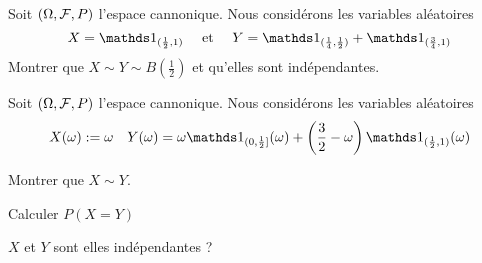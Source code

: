 \documentclass{report}
\begin{document}
\begin{exo}
    Soit \(\left(\Omega,\mathcal{F}, P\right)\) l'espace cannonique. Nous considérons
    les variables aléatoires \[X=\ind_{(\frac12, 1)}\quad\text{ et }\quad
    Y=\ind_{(\frac14,\frac12)} + \ind_{(\frac34, 1)}\] Montrer que \(X\sim Y
    \sim B(\frac12)\) et qu'elles sont indépendantes.
\end{exo}

\begin{exo}
    Soit \(\left(\Omega,\mathcal{F}, P\right)\) l'espace cannonique. Nous considérons
    les variables aléatoires \[X(\omega):=\omega\quad Y(\omega)=
    \omega\ind_{(0,\frac12]}(\omega)+\left(\frac32-\omega\right)
    \ind_{(\frac12, 1)}(\omega)\]
    \begin{q}{1}
        Montrer que \(X\sim Y\).

    \end{q}
    \begin{q}{2}
        Calculer \(P(X=Y)\)
    \end{q}
    \begin{q}{3}
        \(X\) et \(Y\) sont elles indépendantes ?
    \end{q}
\end{exo}
\end{document}
